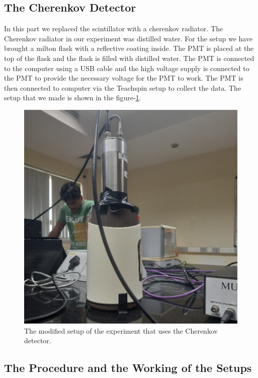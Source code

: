 \documentclass{article}
\begin{document}
\begin{multicols}{2}
\subsection{The Cherenkov Detector}

In this part we replaced the scintillator with a cherenkov radiator. The Cherenkov radiator in our experiment was distilled water. For the setup we have brought a milton flask with a reflective coating inside. The PMT is placed at the top of the flask and the flask is filled with distilled water. The PMT is connected to the computer using a USB cable and the high voltage supply is connected to the PMT to provide the necessary voltage for the PMT to work. The PMT is then connected to computer via the Teachspin setup to collect the data. The setup that we made is shown in the figure-\ref{cherenkovsetup}.


\begin{figure}[H]
    \centering
    \includegraphics[width = \columnwidth]{Images/cherenkovsetup.png}
    \caption{The modified setup of the experiment that uses the Cherenkov detector.}
    \label{cherenkovsetup}
\end{figure}


\subsection{The Procedure and the Working of the Setups}


\end{multicols}
\end{document}
